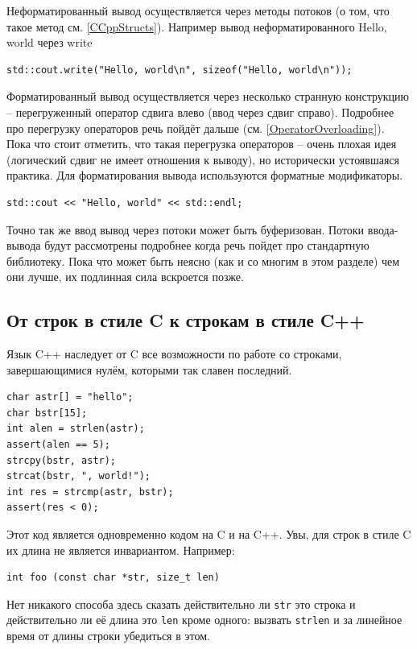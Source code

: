 \documentclass[a4paper,12pt,oneside]{book}
\begin{document}
Неформатированный вывод осуществляется через методы потоков (о том, что такое метод см. \ref{CCppStructs}). Например вывод неформатированного Hello, world через write

\begin{lstlisting}
std::cout.write("Hello, world\n", sizeof("Hello, world\n"));
\end{lstlisting}

Форматированный вывод осуществляется через несколько странную конструкцию -- перегруженный оператор сдвига влево (ввод через сдвиг справо). Подробнее про перегрузку операторов речь пойдёт дальше (см. \ref{OperatorOverloading}). Пока что стоит отметить, что такая перегрузка операторов -- очень плохая идея (логический сдвиг не имеет отношения к выводу), но исторически устоявшаяся практика. Для форматирования вывода используются форматные модификаторы.

\begin{lstlisting}
std::cout << "Hello, world" << std::endl;
\end{lstlisting}

Точно так же ввод вывод через потоки может быть буферизован. Потоки ввода-вывода будут рассмотрены подробнее когда речь пойдет про стандартную библиотеку. Пока что может быть неясно (как и со многим в этом разделе) чем они лучше, их подлинная сила вскроется позже.

\subsection{От строк в стиле C к строкам в стиле C++}\label{subsubsec:cstrings}

Язык C++ наследует от C все возможности по работе со строками, завершающимися нулём, которыми так славен последний.

\begin{lstlisting}
char astr[] = "hello";
char bstr[15];
int alen = strlen(astr);
assert(alen == 5);
strcpy(bstr, astr);
strcat(bstr, ", world!");
int res = strcmp(astr, bstr);
assert(res < 0);
\end{lstlisting}

Этот код является одновременно кодом на C и на C++. Увы, для строк в стиле C их длина не является инвариантом. Например:

\begin{lstlisting}
int foo (const char *str, size_t len)
\end{lstlisting}

Нет никакого способа здесь сказать действительно ли \lstinline!str! это строка и действительно ли её длина это \lstinline!len! кроме одного: вызвать \lstinline!strlen! и за линейное время от длины строки убедиться в этом.
\end{document}
